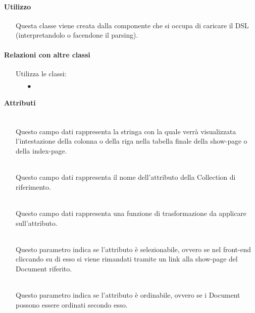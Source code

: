 \paragraph*{Utilizzo}
\begin{itemize}
\item[] Questa classe viene creata dalla componente che si occupa di caricare il DSL (interpretandolo o facendone il parsing).
\end{itemize}

\paragraph*{Relazioni con altre classi}
\begin{itemize}


\item[] Utilizza le classi:
\begin{itemize}
\item[$\bullet$] 
\end{itemize}
\end{itemize}

\paragraph*{Attributi}
\begin{itemize}
\item[]  \\ Questo campo dati rappresenta la stringa con la quale verrà visualizzata l'intestazione della colonna o della riga nella tabella finale della show-page o della index-page.
\item[]  \\ Questo campo dati rappresenta il nome dell'attributo della Collection di riferimento.
\item[]  \\ Questo campo dati rappresenta una funzione di trasformazione da applicare sull'attributo.
\item[]  \\ Questo parametro indica se l'attributo è selezionabile, ovvero se nel front-end cliccando su di esso si viene rimandati tramite un link alla show-page del Document riferito.
\item[]  \\ Questo parametro indica se l'attributo è ordinabile, ovvero se i Document possono essere ordinati secondo esso.
\end{itemize}

